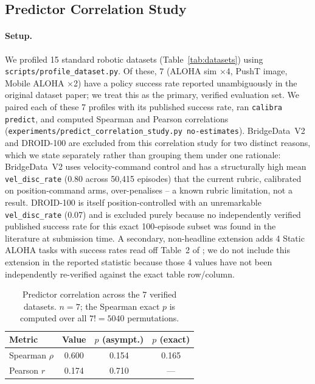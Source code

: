 \documentclass[10pt,twocolumn]{article}
\begin{document}
\subsection{Predictor Correlation Study}
\label{sec:predictor_exp}

\paragraph{Setup.}
We profiled 15 standard robotic datasets (Table~\ref{tab:datasets}) using
\texttt{scripts/profile\_dataset.py}. Of these, 7 (ALOHA sim $\times$4, PushT
image, Mobile ALOHA $\times$2) have a policy success rate reported
unambiguously in the original dataset paper; we treat this as the primary,
verified evaluation set. We paired each of these 7 profiles with its
published success rate, ran \texttt{calibra predict}, and computed Spearman
and Pearson correlations
(\texttt{experiments/predict\_correlation\_study.py \-\-no-estimates}).
BridgeData~V2 and DROID-100 are excluded from this correlation study for two
distinct reasons, which we state separately rather than grouping them under
one rationale: BridgeData~V2 uses velocity-command control and has a
structurally high mean \texttt{vel\_disc\_rate} (0.80 across 50{,}415
episodes) that the current rubric, calibrated on position-command arms,
over-penalises -- a known rubric limitation, not a result. DROID-100 is
itself position-controlled with an unremarkable \texttt{vel\_disc\_rate}
(0.07) and is excluded purely because no independently verified published
success rate for this exact 100-episode subset was found in the literature
at submission time. A secondary, non-headline extension adds 4 Static ALOHA
tasks with success rates read off Table~2 of \citet{zhao2023act}; we do not
include this extension in the reported statistic because those 4 values have
not been independently re-verified against the exact table row/column.

\begin{table}[h]
\centering
\caption{Predictor correlation across the 7 verified datasets. $n=7$; the
Spearman exact $p$ is computed over all $7! = 5040$ permutations.}
\label{tab:predict}
\small
\begin{tabular}{lccc}
\toprule
\textbf{Metric} & \textbf{Value} & \textbf{$p$ (asympt.)} & \textbf{$p$ (exact)} \\
\midrule
Spearman $\rho$ & 0.600 & 0.154 & 0.165 \\
Pearson $r$ & 0.174 & 0.710 & --- \\
\bottomrule
\end{tabular}
\end{table}
\end{document}
